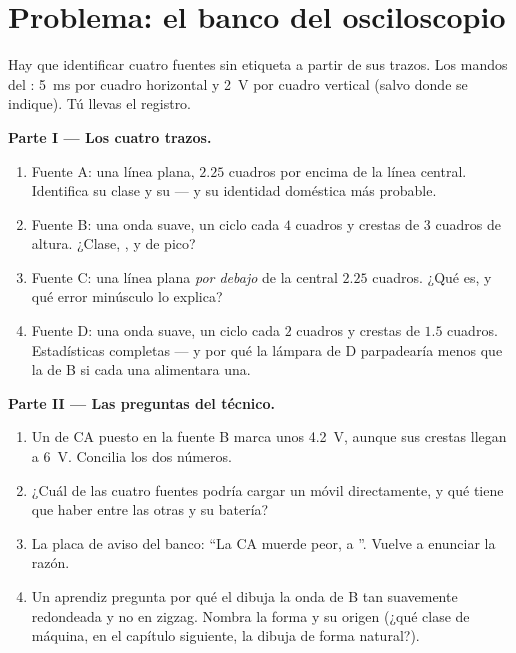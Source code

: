 \section{Problema: el banco del osciloscopio}

\begin{problem}\label{pb:g9:alternating-current:1}
Hay que identificar cuatro fuentes sin etiqueta a partir de sus trazos.
Los mandos del : \qty{5}{ms} por cuadro horizontal y
\qty{2}{V} por cuadro vertical (salvo donde se indique). Tú llevas el
registro.

\medskip\noindent\textbf{Parte I --- Los cuatro trazos.}
\begin{enumerate}
  \item Fuente A: una línea plana, $2.25$ cuadros por encima de la
        línea central. Identifica su clase y su  --- y su
        identidad doméstica más probable.
  \item Fuente B: una onda suave, un ciclo cada $4$ cuadros y
        crestas de $3$ cuadros de altura. ¿Clase,
        ,  y  de
        pico?
  \item Fuente C: una línea plana \emph{por debajo} de la central
        $2.25$ cuadros. ¿Qué es, y qué error minúsculo lo explica?
  \item Fuente D: una onda suave, un ciclo cada $2$ cuadros y
        crestas de $1.5$ cuadros. Estadísticas completas --- y por
        qué la lámpara de D parpadearía menos que la de B si cada una
        alimentara una.
\end{enumerate}

\medskip\noindent\textbf{Parte II --- Las preguntas del técnico.}
\begin{enumerate}[resume]
  \item Un  de CA puesto en la fuente B marca unos
        \qty{4.2}{V}, aunque sus crestas llegan a \qty{6}{V}.
        Concilia los dos números.
  \item ¿Cuál de las cuatro fuentes podría cargar un móvil
        directamente, y qué tiene que haber entre las otras y su
        batería?
  \item La placa de aviso del banco: ``La CA muerde peor,
         a ''. Vuelve a enunciar la razón.
  \item Un aprendiz pregunta por qué el  dibuja la onda
        de B tan suavemente redondeada y no en zigzag. Nombra la
        forma y su origen (¿qué clase de máquina, en el capítulo
        siguiente, la dibuja de forma natural?).
\end{enumerate}


\end{problem}
